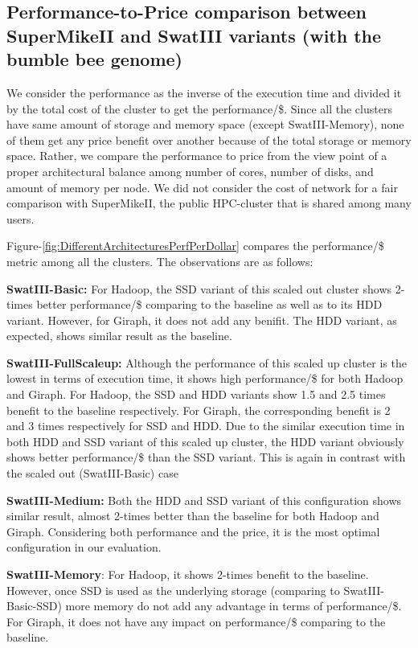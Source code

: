 \documentclass[conference]{IEEEtran}
\begin{document}
\subsection {Performance-to-Price comparison between SuperMikeII and SwatIII variants (with the bumble bee genome)} \label{PriceToPerformanceBumbleBee}
We consider the performance as the inverse of the execution time and divided it by the total cost of the cluster to get the performance/\$. Since all the clusters have same amount of storage and memory space (except SwatIII-Memory), none of them get any price benefit over another because of the total storage or memory space. Rather, we compare the performance to price from the view point of a proper architectural balance among number of cores, number of disks, and amount of memory per node. We did not consider the cost of network for a fair comparison with SuperMikeII, the public HPC-cluster that is shared among many users.

Figure-\ref{fig:DifferentArchitecturesPerfPerDollar} compares the performance/\$ metric among all the clusters. The observations are as follows:
\begin{inparaenum}[\itshape 1\upshape)]
\item \textbf{SwatIII-Basic:} For Hadoop, the SSD variant of this scaled out cluster shows 2-times better performance/\$ comparing to the baseline as well as to its HDD variant. However, for Giraph, it does not add any benifit. The HDD variant, as expected, shows similar result as the baseline.
\item \textbf{SwatIII-FullScaleup:} Although the performance of this scaled up cluster is the lowest in terms of execution time, it shows high performance/\$ for both Hadoop and Giraph. For Hadoop, the SSD and HDD variants show 1.5 and 2.5 times benefit to the baseline respectively. For Giraph, the corresponding benefit is 2 and 3 times respectively for SSD and HDD. Due to the similar execution time in both HDD and SSD variant of this scaled up cluster, the HDD variant obviously shows better performance/\$ than the SSD variant. This is again in contrast with the scaled out (SwatIII-Basic) case
\item \textbf{SwatIII-Medium:} Both the HDD and SSD variant of this configuration shows similar result, almost 2-times better than the baseline for both Hadoop and Giraph. Considering both performance and the price, it is the most optimal configuration in our evaluation.
\item \textbf{SwatIII-Memory}: For Hadoop, it shows 2-times benefit to the baseline. However, once SSD is used as the underlying storage (comparing to SwatIII-Basic-SSD) more memory do not add any advantage in terms of performance/\$. For Giraph, it does not have any impact on performance/\$ comparing to the baseline. 
\end{inparaenum}
\end{document}
